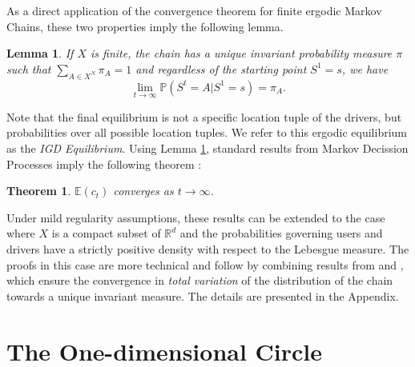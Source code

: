 \documentclass[12pt,english]{article}
\newtheorem{theorem}{Theorem}
\newtheorem{lemma}{Lemma}
\begin{document}
As a direct application of the  convergence theorem for finite ergodic  Markov Chains, these two properties imply the following lemma.
\begin{lemma}\label{Lemma:Ergodic}
    If $X$ is finite, the chain has a unique  invariant probability measure $\pi$ such that $\sum_{A \in X^N} \pi_A =1$ and  regardless of the starting point $S^1=s$, we have 
$$\lim_{t\rightarrow\infty} \mathbb{P}(S^t=A|S^1=s)=\pi_A.$$
\end{lemma}
\noindent Note that the final equilibrium is not a specific location tuple of the drivers, but probabilities over all possible location tuples. We refer to this ergodic equilibrium as the \textit{IGD Equilibrium}. Using Lemma \ref{Lemma:Ergodic}, standard results from Markov Decission Processes imply the following theorem \citep{puterman2014markov}:

\begin{theorem}\label{thm:CostsConverge}
$\mathbb{E}(c_t)$ converges as $t \rightarrow \infty$.     
\end{theorem}
Under mild regularity assumptions, these results can be extended to the case  where $X$ is a  compact subset of $\mathbb{R}^d$ and the probabilities governing users and drivers have a  strictly positive density
with respect to the Lebesgue measure. The proofs in this case are  more technical and follow  by combining results from \cite{meyn2012markov} and \cite{lasserre2000invariant},
which ensure the convergence in \textit{total variation} of the  distribution of the chain towards a unique invariant measure. The details are presented in the Appendix.

\section{The One-dimensional Circle}\label{sec:1d}
\end{document}
